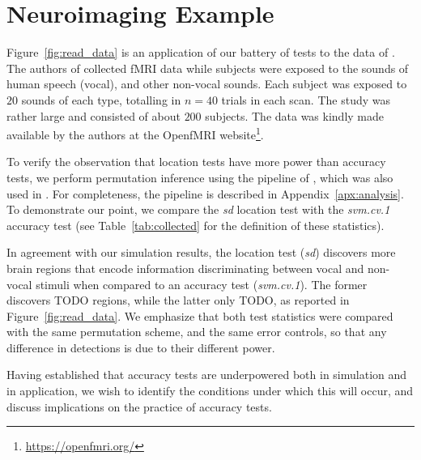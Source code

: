 \documentclass[12pt,a4paper]{article}
\begin{document}
\section{Neuroimaging Example}
\label{sec:example}

Figure~\ref{fig:read_data} is an application of our battery of tests to the data of \cite{pernet_human_2015}. 
The authors of \cite{pernet_human_2015} collected fMRI data while subjects were exposed to the sounds of human speech (vocal), and other non-vocal sounds. 
Each subject was exposed to $20$ sounds of each type, totalling in $n=40$ trials in each scan.
The study was rather large and consisted of about $200$ subjects.
The data was kindly made available by the authors at the OpenfMRI website\footnote{\url{https://openfmri.org/}}.

To verify the observation that location tests have more power than accuracy tests, we perform permutation inference using the pipeline of \cite{stelzer_statistical_2013}, which was also used in \cite{gilron_quantifying_2016}. 
For completeness, the pipeline is described in Appendix~\ref{apx:analysis}. 
To demonstrate our point, we compare the \emph{sd} location test with the \emph{svm.cv.1} accuracy test (see Table~\ref{tab:collected} for the definition of these statistics). 

In agreement with our simulation results, the location test (\emph{sd}) discovers more brain regions that encode information discriminating between vocal and non-vocal stimuli when compared to an accuracy test (\emph{svm.cv.1}).
The former discovers TODO regions, while the latter only TODO, as reported in Figure~\ref{fig:read_data}.
We emphasize that both test statistics were compared with the same permutation scheme, and the same error controls, so that any difference in detections is due to their different power.

Having established that accuracy tests are underpowered both in simulation and in application, we wish to identify the conditions under which this will occur, and discuss implications on the practice of accuracy tests. 
\end{document}
